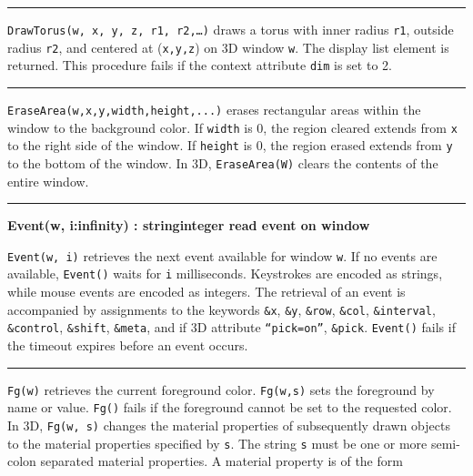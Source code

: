 \bigskip\hrule\vspace{0.1cm}

\noindent
\texttt{DrawTorus(w, x, y, z, r1, r2,{\dots})} draws a torus with
inner radius \texttt{r1}, outside radius \texttt{r2}, and centered at
(\texttt{x,y,z}) on 3D window \texttt{w}. The display list element is
returned. This procedure fails if the context attribute \texttt{dim} is
set to 2.

\bigskip\hrule\vspace{0.1cm}

\noindent
\texttt{EraseArea(w,x,y,width,height,...)} erases rectangular areas
within the window to the background color. If \texttt{width} is 0,
the region cleared extends from \texttt{x} to the right side of the
window. If \texttt{height} is 0, the region erased extends from
\texttt{y} to the bottom of the window. In 3D, \texttt{EraseArea(W)}
clears the contents of the entire window.

\bigskip\hrule\vspace{0.1cm}
\noindent
{\bf Event(w, i:infinity) : string{\textbar}integer \hfill
 read event on window}

\noindent
\texttt{Event(w, i)} retrieves the next event available for window
\texttt{w}. If no events are available, \texttt{Event()} waits for
\texttt{i} milliseconds. Keystrokes are encoded as strings, while mouse
events are encoded as integers. The retrieval of an event is
accompanied by assignments to the keywords \texttt{\&x}, \texttt{\&y},
\texttt{\&row}, \texttt{\&col}, \texttt{\&interval},
\texttt{\&control}, \texttt{\&shift}, \texttt{\&meta}, and if 3D
attribute \texttt{{\textquotedblleft}pick=on{\textquotedblright}},
\texttt{\&pick}. \texttt{Event()} fails if the timeout expires before
an event occurs.

\bigskip\hrule\vspace{0.1cm}

\noindent
\texttt{Fg(w)} retrieves the current foreground color. \texttt{Fg(w,s)}
sets the foreground by name or value. \texttt{Fg()} fails if the
foreground cannot be set to the requested color. In 3D, \texttt{Fg(w,
s)} changes the material properties of subsequently drawn objects to
the material properties specified by \texttt{s}. The string \texttt{s}
must be one or more semi-colon separated material properties. A
material property is of the form 

